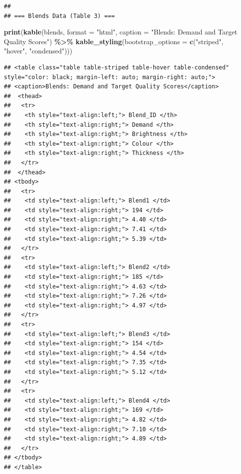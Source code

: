 \documentclass[
]{article}
\newenvironment{Shaded}{\begin{snugshade}}{\end{snugshade}}
\newcommand{\AttributeTok}[1]{\textcolor[rgb]{0.13,0.29,0.53}{#1}}
\newcommand{\FunctionTok}[1]{\textcolor[rgb]{0.13,0.29,0.53}{\textbf{#1}}}
\newcommand{\NormalTok}[1]{#1}
\newcommand{\SpecialCharTok}[1]{\textcolor[rgb]{0.81,0.36,0.00}{\textbf{#1}}}
\newcommand{\StringTok}[1]{\textcolor[rgb]{0.31,0.60,0.02}{#1}}
\begin{document}
\begin{verbatim}
## 
## === Blends Data (Table 3) ===
\end{verbatim}

\begin{Shaded}
\begin{Highlighting}[]
\FunctionTok{print}\NormalTok{(}\FunctionTok{kable}\NormalTok{(blends, }\AttributeTok{format =} \StringTok{"html"}\NormalTok{, }\AttributeTok{caption =} \StringTok{"Blends: Demand and Target Quality Scores"}\NormalTok{) }\SpecialCharTok{\%\textgreater{}\%}
      \FunctionTok{kable\_styling}\NormalTok{(}\AttributeTok{bootstrap\_options =} \FunctionTok{c}\NormalTok{(}\StringTok{"striped"}\NormalTok{, }\StringTok{"hover"}\NormalTok{, }\StringTok{"condensed"}\NormalTok{)))}
\end{Highlighting}
\end{Shaded}

\begin{verbatim}
## <table class="table table-striped table-hover table-condensed" style="color: black; margin-left: auto; margin-right: auto;">
## <caption>Blends: Demand and Target Quality Scores</caption>
##  <thead>
##   <tr>
##    <th style="text-align:left;"> Blend_ID </th>
##    <th style="text-align:right;"> Demand </th>
##    <th style="text-align:right;"> Brightness </th>
##    <th style="text-align:right;"> Colour </th>
##    <th style="text-align:right;"> Thickness </th>
##   </tr>
##  </thead>
## <tbody>
##   <tr>
##    <td style="text-align:left;"> Blend1 </td>
##    <td style="text-align:right;"> 194 </td>
##    <td style="text-align:right;"> 4.40 </td>
##    <td style="text-align:right;"> 7.41 </td>
##    <td style="text-align:right;"> 5.39 </td>
##   </tr>
##   <tr>
##    <td style="text-align:left;"> Blend2 </td>
##    <td style="text-align:right;"> 185 </td>
##    <td style="text-align:right;"> 4.63 </td>
##    <td style="text-align:right;"> 7.26 </td>
##    <td style="text-align:right;"> 4.97 </td>
##   </tr>
##   <tr>
##    <td style="text-align:left;"> Blend3 </td>
##    <td style="text-align:right;"> 154 </td>
##    <td style="text-align:right;"> 4.54 </td>
##    <td style="text-align:right;"> 7.35 </td>
##    <td style="text-align:right;"> 5.12 </td>
##   </tr>
##   <tr>
##    <td style="text-align:left;"> Blend4 </td>
##    <td style="text-align:right;"> 169 </td>
##    <td style="text-align:right;"> 4.82 </td>
##    <td style="text-align:right;"> 7.10 </td>
##    <td style="text-align:right;"> 4.89 </td>
##   </tr>
## </tbody>
## </table>
\end{verbatim}
\end{document}
